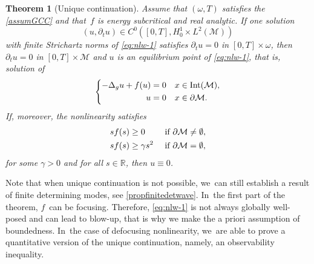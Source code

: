 \documentclass[JEP,XML,SOM,Unicode,published]{cedram}
\newtheorem{theorem}{Theorem}[section]
\theoremstyle{definition}
\let\mc\mathcal
\newcommand{\M}{\mc{M}}
\newcommand{\R}{\mathbb{R}}
\begin{document}
\begin{theorem}[Unique continuation]\label{thm:unique-continuation-nlw}
Assume that $(\omega, T)$ satisfies the \ref{assumGCC} and that~$f$ is energy subcritical and real analytic. If one solution
\[
(u,\partial_t u)\in C^0([0, T], H^1_0\times L^2(\M))
\]
with finite Strichartz norms of \eqref{eq:nlw-1} satisfies $\partial_t u=0$ in $[0, T]\times \omega$, then $\partial_t u=0$ in $[0, T]\times \M$ and $u$ is an equilibrium point of \eqref{eq:nlw-1}, that is, solution of
\begin{align}\label{thm:eq:nlw-equilibrium}
\left\{\begin{aligned}
-\Delta_g u+f(u)&=0 &x&\in\textnormal{Int}(\M),\\
u&=0 &x&\in \partial\M.
\end{aligned}\right.
\end{align}
If, moreover, the nonlinearity satisfies
\begin{align}
\label{defdefocusing}
sf(s)&\geq 0\quad\quad \textnormal{ if }\partial \M\neq \emptyset,\\
\nonumber sf(s)&\geq \gamma s^2\quad \textnormal{ if }\partial \M= \emptyset,
\end{align}
for some $\gamma>0$ and for all $s\in \R$, then $u\equiv 0$.
\end{theorem}

Note that when unique continuation is not possible, we~can still establish a result of finite determining modes, see \cref{propfinitedetwave}. In~the first part of the theorem, $f$~can be focusing. Therefore, \eqref{eq:nlw-1} is not always globally well-posed and can lead to blow-up, that is why we make the a priori assumption of boundedness. In~the case of defocusing nonlinearity, we~are able to prove a quantitative version of the unique continuation, namely, an observability inequality.
\end{document}
